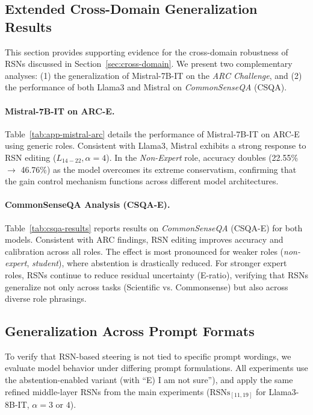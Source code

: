 \documentclass{article}
\begin{document}
\subsection{Extended Cross-Domain Generalization Results}
\label{app:generalization-extended}

This section provides supporting evidence for the cross-domain robustness of RSNs discussed in Section~\ref{sec:cross-domain}. We present two complementary analyses: (1) the generalization of Mistral-7B-IT on the \emph{ARC Challenge}, and (2) the performance of both Llama3 and Mistral on \emph{CommonSenseQA} (CSQA).

\paragraph{Mistral-7B-IT on ARC-E.}
Table~\ref{tab:app-mistral-arc} details the performance of Mistral-7B-IT on ARC-E using generic roles. Consistent with Llama3, Mistral exhibits a strong response to RSN editing ($L_{14-22}, \alpha{=}4$). In the \emph{Non-Expert} role, accuracy doubles (22.55\% $\to$ 46.76\%) as the model overcomes its extreme conservatism, confirming that the gain control mechanism functions across different model architectures.

\paragraph{CommonSenseQA Analysis (CSQA-E).}
Table~\ref{tab:csqa-results} reports results on \emph{CommonSenseQA} (CSQA-E) for both models. Consistent with ARC findings, RSN editing improves accuracy and calibration across all roles. The effect is most pronounced for weaker roles (\emph{non-expert}, \emph{student}), where abstention is drastically reduced. For stronger expert roles, RSNs continue to reduce residual uncertainty (E-ratio), verifying that RSNs generalize not only across tasks (Scientific vs. Commonsense) but also across diverse role phrasings.

\subsection{Generalization Across Prompt Formats}
\label{app:prompt-generalization}
To verify that RSN-based steering is not tied to specific prompt wordings, we evaluate model behavior under differing prompt formulations. All experiments use the abstention-enabled variant (with ``E) I am not sure''), and apply the same refined middle-layer RSNs from the main experiments ($\text{RSNs}_{[11,19]}$ for Llama3-8B-IT, $\alpha{=}3$ or $4$).
\end{document}

